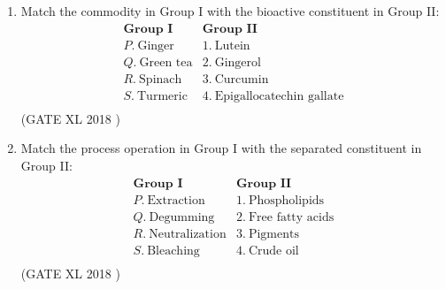 \documentclass[14pt]{extarticle}
\begin{document}
\begin{flushleft}
\begin{enumerate}
\item Match the commodity in Group I with the bioactive constituent in Group II:
\[
\begin{array}{ll}
\textbf{Group I} & \textbf{Group II} \\
P. \ \text{Ginger} & 1. \ \text{Lutein} \\
Q. \ \text{Green tea} & 2. \ \text{Gingerol} \\
R. \ \text{Spinach} & 3. \ \text{Curcumin} \\
S. \ \text{Turmeric} & 4. \ \text{Epigallocatechin gallate} \\
\end{array}
\]
\hfill(GATE XL 2018 )\\
\begin{enumerate}
\end{enumerate}

\item Match the process operation in Group I with the separated constituent in Group II:
\[
\begin{array}{ll}
\textbf{Group I} & \textbf{Group II} \\
P. \ \text{Extraction} & 1. \ \text{Phospholipids} \\
Q. \ \text{Degumming} & 2. \ \text{Free fatty acids} \\
R. \ \text{Neutralization} & 3. \ \text{Pigments} \\
S. \ \text{Bleaching} & 4. \ \text{Crude oil} \\
\end{array}
\]
\hfill(GATE XL 2018 )\\
\begin{enumerate}
\end{enumerate}


\end{enumerate}
\end{flushleft}
\end{document}
